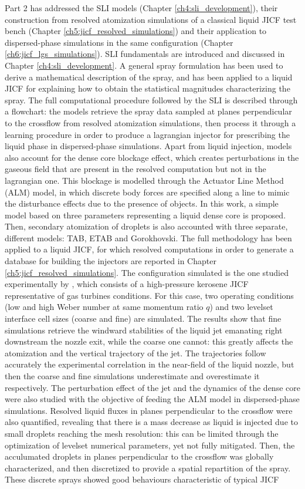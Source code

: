 Part 2 has addressed the SLI models (Chapter \ref{ch4:sli_development}), their construction from resolved atomization simulations of a classical liquid JICF test bench (Chapter \ref{ch5:jicf_resolved_simulations}) and their application to dispersed-phase simulations in the same configuration (Chapter \ref{ch6:jicf_lgs_simulations}). SLI fundamentals are introduced and discussed in Chapter \ref{ch4:sli_development}. A general spray formulation has been used to derive  a mathematical description of the spray, and has been applied to a liquid JICF for explaining how to obtain the statistical magnitudes characterizing the spray. The full computational procedure followed by the SLI is described through a flowchart: the models retrieve the spray data sampled at planes perpendicular to the crossflow from resolved atomization simulations, then process it through a learning procedure in order to produce a lagrangian injector for prescribing the liquid phase in dispersed-phase simulations. Apart from liquid injection, models also account for the dense core blockage effect, which creates perturbations in the gaseous field that are present in the resolved computation but not in the lagrangian one. This blockage is modelled through the Actuator Line Method (ALM) model, in which discrete body forces are specified along a line to mimic the disturbance effects due to the presence of objects. In this work, a simple model based on three parameters representing a liquid dense core is proposed. Then, secondary atomization of droplets is also accounted with three separate, different models: TAB, ETAB and Gorokhovski. The full methodology has been applied to a liquid JICF, for which resolved computations in order to generate a database for building the injectors are reported in Chapter \ref{ch5:jicf_resolved_simulations}. The configuration simulated is the one studied experimentally by , which consists of a high-pressure kerosene JICF representative of gas turbines conditions. For this case, two operating conditions (low and high Weber number at same momentum ratio $q$) and two levelset interface cell sizes (coarse and fine) are simulated. The results show that fine simulations retrieve the windward stabilities of the liquid jet emanating right downstream the nozzle exit, while the coarse one cannot: this greatly affects the atomization and the vertical trajectory of the jet. The trajectories follow accurately the experimental correlation in the near-field of the liquid nozzle, but then the coarse and fine simulations underestimate and overestimate it respectively. The perturbation effect of the jet and the dynamics of the dense core were also studied with the objective of feeding the ALM model in dispersed-phase simulations. Resolved liquid fluxes in planes perpendicular to the crossflow were also quantified, revealing that there is a mass decrease as liquid is injected due to small droplets reaching the mesh resolution:  this can be limited through the optimization of levelset numerical parameters, yet not fully mitigated. Then, the acculumated droplets in planes perpendicular to the crossflow  was globally characterized, and then discretized to provide a spatial repartition of the spray. These discrete sprays showed good behaviours characteristic of typical JICF 